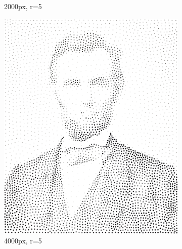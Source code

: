 \documentclass[11pt]{article}
\begin{document}
\begin{figure}[H]
\begin{subfigure}[b]{0.2\linewidth}
		\caption{2000px, r=5}
	\end{subfigure}
	\begin{subfigure}[b]{0.2\linewidth}
		\includegraphics[width=\linewidth]{pix/hc_AL_4000_r5.png}
		\caption{4000px, r=5}
	\end{subfigure}
	\begin{subfigure}[b]{0.2\linewidth}

\end{subfigure}
\end{figure}
\end{document}
